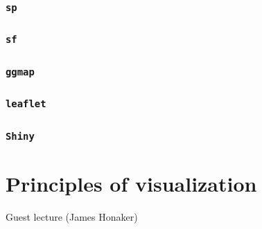 \documentclass[]{book}
\theoremstyle{definition}
\theoremstyle{definition}
\theoremstyle{definition}
\theoremstyle{remark}
\begin{document}
\subsubsection{\texorpdfstring{\texttt{sp}}{sp}}\label{sp}

\subsubsection{\texorpdfstring{\texttt{sf}}{sf}}\label{sf}

\subsubsection{\texorpdfstring{\texttt{ggmap}}{ggmap}}\label{ggmap}

\subsubsection{\texorpdfstring{\texttt{leaflet}}{leaflet}}\label{leaflet}

\subsubsection{\texorpdfstring{\texttt{Shiny}}{Shiny}}\label{shiny}

\section{Principles of visualization}\label{principles-of-visualization}

Guest lecture (James Honaker)


\end{document}
